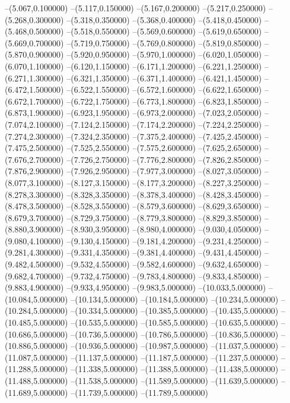 --(5.067,0.100000)
--(5.117,0.150000)
--(5.167,0.200000)
--(5.217,0.250000)
--(5.268,0.300000)
--(5.318,0.350000)
--(5.368,0.400000)
--(5.418,0.450000)
--(5.468,0.500000)
--(5.518,0.550000)
--(5.569,0.600000)
--(5.619,0.650000)
--(5.669,0.700000)
--(5.719,0.750000)
--(5.769,0.800000)
--(5.819,0.850000)
--(5.870,0.900000)
--(5.920,0.950000)
--(5.970,1.000000)
--(6.020,1.050000)
--(6.070,1.100000)
--(6.120,1.150000)
--(6.171,1.200000)
--(6.221,1.250000)
--(6.271,1.300000)
--(6.321,1.350000)
--(6.371,1.400000)
--(6.421,1.450000)
--(6.472,1.500000)
--(6.522,1.550000)
--(6.572,1.600000)
--(6.622,1.650000)
--(6.672,1.700000)
--(6.722,1.750000)
--(6.773,1.800000)
--(6.823,1.850000)
--(6.873,1.900000)
--(6.923,1.950000)
--(6.973,2.000000)
--(7.023,2.050000)
--(7.074,2.100000)
--(7.124,2.150000)
--(7.174,2.200000)
--(7.224,2.250000)
--(7.274,2.300000)
--(7.324,2.350000)
--(7.375,2.400000)
--(7.425,2.450000)
--(7.475,2.500000)
--(7.525,2.550000)
--(7.575,2.600000)
--(7.625,2.650000)
--(7.676,2.700000)
--(7.726,2.750000)
--(7.776,2.800000)
--(7.826,2.850000)
--(7.876,2.900000)
--(7.926,2.950000)
--(7.977,3.000000)
--(8.027,3.050000)
--(8.077,3.100000)
--(8.127,3.150000)
--(8.177,3.200000)
--(8.227,3.250000)
--(8.278,3.300000)
--(8.328,3.350000)
--(8.378,3.400000)
--(8.428,3.450000)
--(8.478,3.500000)
--(8.528,3.550000)
--(8.579,3.600000)
--(8.629,3.650000)
--(8.679,3.700000)
--(8.729,3.750000)
--(8.779,3.800000)
--(8.829,3.850000)
--(8.880,3.900000)
--(8.930,3.950000)
--(8.980,4.000000)
--(9.030,4.050000)
--(9.080,4.100000)
--(9.130,4.150000)
--(9.181,4.200000)
--(9.231,4.250000)
--(9.281,4.300000)
--(9.331,4.350000)
--(9.381,4.400000)
--(9.431,4.450000)
--(9.482,4.500000)
--(9.532,4.550000)
--(9.582,4.600000)
--(9.632,4.650000)
--(9.682,4.700000)
--(9.732,4.750000)
--(9.783,4.800000)
--(9.833,4.850000)
--(9.883,4.900000)
--(9.933,4.950000)
--(9.983,5.000000)
--(10.033,5.000000)
--(10.084,5.000000)
--(10.134,5.000000)
--(10.184,5.000000)
--(10.234,5.000000)
--(10.284,5.000000)
--(10.334,5.000000)
--(10.385,5.000000)
--(10.435,5.000000)
--(10.485,5.000000)
--(10.535,5.000000)
--(10.585,5.000000)
--(10.635,5.000000)
--(10.686,5.000000)
--(10.736,5.000000)
--(10.786,5.000000)
--(10.836,5.000000)
--(10.886,5.000000)
--(10.936,5.000000)
--(10.987,5.000000)
--(11.037,5.000000)
--(11.087,5.000000)
--(11.137,5.000000)
--(11.187,5.000000)
--(11.237,5.000000)
--(11.288,5.000000)
--(11.338,5.000000)
--(11.388,5.000000)
--(11.438,5.000000)
--(11.488,5.000000)
--(11.538,5.000000)
--(11.589,5.000000)
--(11.639,5.000000)
--(11.689,5.000000)
--(11.739,5.000000)
--(11.789,5.000000)
